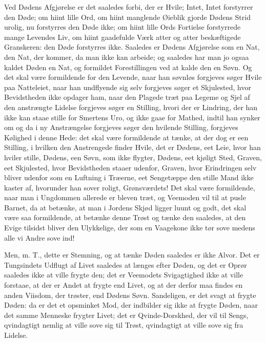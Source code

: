 \documentclass[12pt,a4paper]{article}
\begin{document}
Ved Dødens Afgjørelse er det saaledes forbi, der er Hvile; Intet, Intet forstyrrer den Døde; om hiint lille Ord, om hiint manglende Øieblik gjorde Dødens Strid urolig, nu forstyrres den Døde ikke; om hiint lille Ords Fortielse forstyrrede mange Levendes Liv, om hiint gaadefulde Værk atter og atter beskæftigede Granskeren: den Døde forstyrres ikke. Saaledes er Dødens Afgjørelse som en Nat, den Nat, der kommer, da man ikke kan arbeide; og saaledes har man jo ogsaa kaldet Døden en Nat, og formildet Forestillingen ved at kalde den en Søvn. Og det skal være formildende for den Levende, naar han søvnløs forgjeves søger Hvile paa Natteleiet, naar han undflyende sig selv forgjeves søger et Skjulested, hvor Bevidstheden ikke opdager ham, naar den Plagede træt paa Legeme og Sjel af den anstrængte Lidelse forgjeves søger en Stilling, hvori der er Lindring, der han ikke kan staae stille for Smertens Uro, og ikke gaae for Mathed, indtil han synker om og da i ny Anstrængelse forgjeves søger den hvilende Stilling, forgjeves Kølighed i denne Hede: det skal være formildende at tænke, at der dog er een Stilling, i hvilken den Anstrengede finder Hvile, det er Dødens, eet Leie, hvor han hviler stille, Dødens, een Søvn, som ikke flygter, Dødens, eet kjøligt Sted, Graven, eet Skjulested, hvor Bevidstheden staaer udenfor, Graven, hvor Erindringen selv bliver udenfor som en Luftning i Træerne, eet Sengetæppe den stille Mand ikke kaster af, hvorunder han sover roligt, Grønsværdets! Det skal være formildende, naar man i Ungdommen allerede er bleven træt, og Veemoden vil til at pusle Barnet, da at betænke, at man i Jordens Skjød ligger luunt og godt, det skal være saa formildende, at betænke denne Trøst og tænke den saaledes, at den Evige tilsidst bliver den Ulykkelige, der som en Vaagekone ikke tør sove medens alle vi Andre sove ind!

Men, m. T., dette er Stemning, og at tænke Døden saaledes er ikke Alvor. Det er Tungsindets Udflugt af Livet saaledes at længes efter Døden, og det er Oprør saaledes ikke at ville frygte den; det er Veemodets Svigagtighed ikke at ville forstaae, at der er Andet at frygte end Livet, og at der derfor maa findes en anden Viisdom, der trøster, end Dødens Søvn. Sandeligen, er det svagt at frygte Døden: da er det et opsminket Mod, der indbilder sig ikke at frygte Døden, naar det samme Menneske frygter Livet; det er Qvinde-Dorskhed, der vil til Sengs, qvindagtigt nemlig at ville sove sig til Trøst, qvindagtigt at ville sove sig fra Lidelse.
\end{document}
